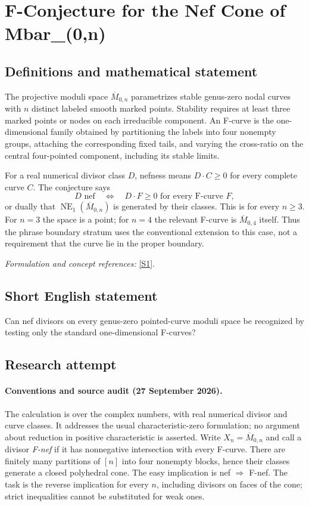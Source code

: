 \documentclass[11pt]{article}
\begin{document}
\section*{\texorpdfstring{F-Conjecture for the Nef Cone of Mbar\_(0,n)}{F-Conjecture for the Nef Cone of Mbar\_(0,n)}}\label{statement}
\subsection{Definitions and mathematical statement}
The projective moduli space $\overline M_{0,n}$ parametrizes stable genus-zero nodal curves with $n$ distinct labeled smooth marked points. Stability requires at least three marked points or nodes on each irreducible component. An F-curve is the one-dimensional family obtained by partitioning the labels into four nonempty groups, attaching the corresponding fixed tails, and varying the cross-ratio on the central four-pointed component, including its stable limits.

For a real numerical divisor class $D$, nefness means $D\cdot C\ge0$ for every complete curve $C$. The conjecture says
\[
 D\text{ nef}\quad\Longleftrightarrow\quad
 D\cdot F\ge0\text{ for every F-curve }F,
\]
or dually that $\overline{\operatorname{NE}}_1(\overline M_{0,n})$ is generated by their classes. This is for every $n\ge3$. For $n=3$ the space is a point; for $n=4$ the relevant F-curve is $\overline M_{0,4}$ itself. Thus the phrase boundary stratum uses the conventional extension to this case, not a requirement that the curve lie in the proper boundary.
\par\smallskip\textit{Formulation and concept references:} \href{https://arxiv.org/html/2507.12434v1}{[S1]}.

\subsection{Short English statement}
Can nef divisors on every genus-zero pointed-curve moduli space be recognized by testing only the standard one-dimensional F-curves?
\subsection{Research attempt}

\paragraph{Conventions and source audit (27 September 2026).}
The calculation is over the complex numbers, with real numerical divisor
and curve classes. It addresses the usual characteristic-zero formulation;
no argument about reduction in positive characteristic is asserted. Write
$X_n=\overline M_{0,n}$ and call a divisor \emph{F-nef} if it has nonnegative
intersection with every F-curve. There are finitely many partitions of
$[n]$ into four nonempty blocks, hence their classes generate a closed
polyhedral cone. The easy implication is nef $\Rightarrow$ F-nef. The task
is the reverse implication for every $n$, including divisors on faces of
the cone; strict inequalities cannot be substituted for weak ones.
\end{document}
